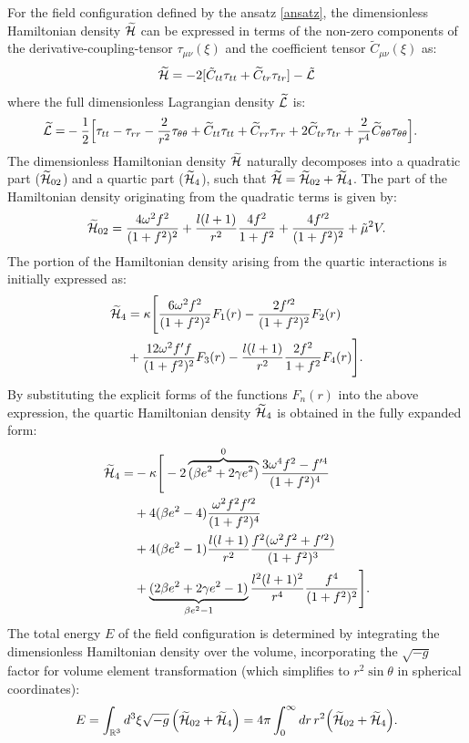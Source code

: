 \documentclass[aps,prd,superscriptaddress,notitlepage,11pt,final,longbibliography,nofootinbib]{revtex4-1}
\newcommand{\be}{\begin{equation}}
\newcommand{\ee}{\end{equation}}
\numberwithin{equation}{section}
\begin{document}
For the field configuration defined by the ansatz \eqref{ansatz}, the dimensionless Hamiltonian density $\widetilde{\cal H}$ can be expressed in terms of the non-zero components of the derivative-coupling-tensor $\tau_{\mu\nu}(\xi)$ and the coefficient tensor $\widetilde{C}_{\mu\nu}(\xi)$ as:
\be
\widetilde{\cal H}=-2[\tilde C_{tt}\tau_{tt}+\widetilde C_{tr}\tau_{tr}]-\tilde{\cal L}
\ee
where the full dimensionless Lagrangian density $\widetilde{\cal L}$ is:
\begin{align}
\widetilde{\cal L}=&-\frac{1}{2}\Big[\tau_{tt}-\tau_{rr}-\frac{2}{r^2}\tau_{\theta\theta}+\widetilde C_{tt}\tau_{tt}+\widetilde C_{rr}\tau_{rr}+2\widetilde C_{tr}\tau_{tr}+\frac{2}{r^4}\widetilde C_{\theta\theta}\tau_{\theta\theta}\Big].\nonumber
\end{align}
The dimensionless Hamiltonian density $\widetilde{\cal H}$ naturally decomposes into a quadratic part ($\widetilde{\cal H}_{02}$) and a quartic part ($\widetilde{\cal H}_{4}$), such that $\widetilde{\cal H}=\widetilde{\cal H}_{02}+\widetilde{\cal H}_{4}$. The part of the Hamiltonian density originating from the quadratic terms is given by:
\begin{align}
\widetilde {\cal H}_{02}=\frac{4\omega^2f^2}{(1+f^2)^2}+\frac{l(l+1)}{r^2}\frac{4f^2}{1+f^2}+\frac{4f'^2}{(1+f^2)^2}+\tilde\mu^2V.\label{H0}
\end{align}
The portion of the Hamiltonian density arising from the quartic interactions is initially expressed as:
\begin{align}
\widetilde {\cal H}_4&=\kappa\Bigg[\frac{6\omega^2f^2}{(1+f^2)^2}F_1(r)-\frac{2f'^2}{(1+f^2)^2}F_2(r)\nonumber\\&+\frac{12\omega^2 f'f}{(1+f^2)^2}F_3(r)-\frac{l(l+1)}{r^2}\frac{2f^2}{1+f^2}F_4(r)\Bigg].\label{H1a}
\end{align}
By substituting the explicit forms of the functions $F_n(r)$ into the above expression, the quartic Hamiltonian density $\widetilde{\cal H}_4$ is obtained in the fully expanded form:
\begin{align}
\widetilde{\cal H}_4=&-\kappa\Bigg[-2\overbrace{(\beta e^2+2\gamma e^2)}^{0}\frac{3\omega^4f^2-f'^4}{(1+f^2)^4}\nonumber\\&+4(\beta e^2-4)\frac{\omega^2f^2f'^2}{(1+f^2)^4}\nonumber\\&+4(\beta e^2-1)\frac{l(l+1)}{r^2}\frac{f^2(\omega^2f^2+f'^2)}{(1+f^2)^3}\nonumber\\
&+\underbrace{(2\beta e^2+2\gamma e^2-1)}_{\beta e^2-1}\frac{l^2(l+1)^2}{r^4}\frac{f^4}{(1+f^2)^2}\Bigg].\label{H1b}
\end{align}
The total energy $E$ of the field configuration is determined by integrating the dimensionless Hamiltonian density over the volume, incorporating the $\sqrt{-g}$ factor for volume element transformation (which simplifies to $r^2 \sin\theta$ in spherical coordinates):
\begin{align*}
E=\int_{{\mathbb{R}}^3}d^3\xi\sqrt{-g}\,\Big(\widetilde {\cal H}_{02}+\widetilde {\cal H}_4\Big)
=4\pi\int_0^{\infty}dr\, r^2\Big(\widetilde {\cal H}_{02}+\widetilde {\cal H}_4\Big).
\end{align*}
\end{document}
